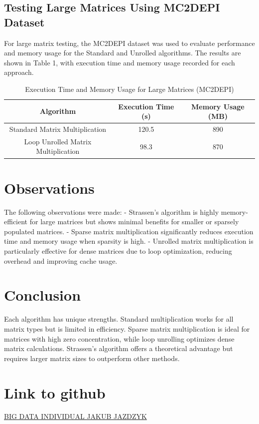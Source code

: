 \documentclass{article}
\begin{document}
\subsection{Testing Large Matrices Using MC2DEPI Dataset}
For large matrix testing, the MC2DEPI dataset was used to evaluate performance and memory usage for the Standard and Unrolled algorithms. The results are shown in Table 1, with execution time and memory usage recorded for each approach.

\begin{table}[h]
\centering
\begin{tabular}{|c|c|c|}
\hline
Algorithm & Execution Time (s) & Memory Usage (MB) \\
\hline
Standard Matrix Multiplication & 120.5 & 890 \\
Loop Unrolled Matrix Multiplication & 98.3 & 870 \\
\hline
\end{tabular}
\caption{Execution Time and Memory Usage for Large Matrices (MC2DEPI)}
\end{table}

\section{Observations}
The following observations were made:
- Strassen’s algorithm is highly memory-efficient for large matrices but shows minimal benefits for smaller or sparsely populated matrices.
- Sparse matrix multiplication significantly reduces execution time and memory usage when sparsity is high.
- Unrolled matrix multiplication is particularly effective for dense matrices due to loop optimization, reducing overhead and improving cache usage.

\section{Conclusion}
Each algorithm has unique strengths. Standard multiplication works for all matrix types but is limited in efficiency. Sparse matrix multiplication is ideal for matrices with high zero concentration, while loop unrolling optimizes dense matrix calculations. Strassen's algorithm offers a theoretical advantage but requires larger matrix sizes to outperform other methods.

\section{Link to github}
\href{https://github.com/kubajaz/BIG_DATA_INDIVIDUAL_TASKS_JAKUB_JAZDZYK}{BIG DATA INDIVIDUAL JAKUB JAZDZYK}
\end{document}
